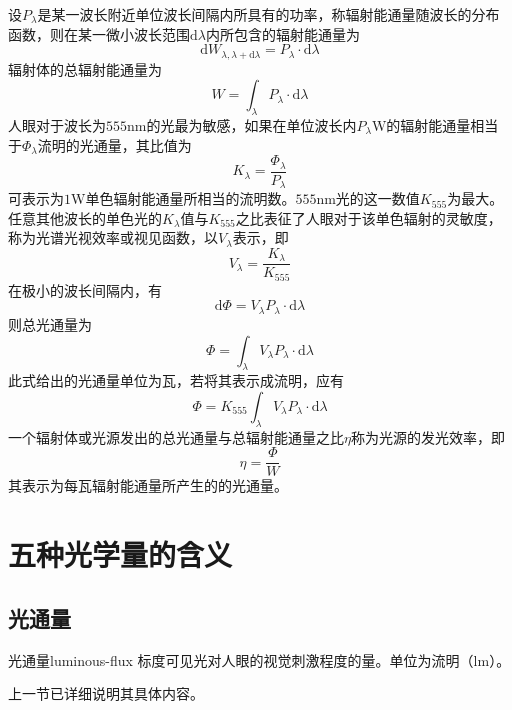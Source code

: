 \documentclass[cn,10pt,chinesefont=founder,math=newtx,cite=super,twoside]{elegantbook}
\begin{document}
设$P_\lambda$是某一波长附近单位波长间隔内所具有的功率，称辐射能通量随波长的分布函数，则在某一微小波长范围$\mathrm{d}\lambda$内所包含的辐射能通量为
\begin{equation}
\mathrm{d}W_{\lambda,\lambda+\mathrm{d}\lambda}=P_{\lambda}\cdot\mathrm{d}\lambda
\end{equation}
辐射体的总辐射能通量为
\begin{equation}
W=\int_{\lambda} P_{\lambda}\cdot\mathrm{d}\lambda
\end{equation}
人眼对于波长为$555$nm的光最为敏感，如果在单位波长内$P_{\lambda}$W的辐射能通量相当于$\varPhi_{\lambda}$流明的光通量，其比值为
\begin{equation}
K_{\lambda}=\frac{\varPhi_{\lambda}}{P_{\lambda}}
\end{equation}
可表示为$1$W单色辐射能通量所相当的流明数。$555$nm光的这一数值$K_{555}$为最大。任意其他波长的单色光的$K_{\lambda}$值与$K_{555}$之比表征了人眼对于该单色辐射的灵敏度，称为光谱光视效率或视见函数，以$V_{\lambda}$表示，即
\begin{equation}
V_{\lambda}=\frac{K_{\lambda}}{K_{555}}
\end{equation}
在极小的波长间隔内，有
\begin{equation}
\mathrm{d}\varPhi=V_{\lambda}P_{\lambda}\cdot\mathrm{d}\lambda
\end{equation}
则总光通量为
\begin{equation}
\varPhi=\int_{\lambda}V_{\lambda}P_{\lambda}\cdot\mathrm{d}\lambda
\end{equation}
此式给出的光通量单位为瓦，若将其表示成流明，应有
\begin{equation}
\varPhi=K_{555}\int_{\lambda}V_{\lambda}P_{\lambda}\cdot\mathrm{d}\lambda
\end{equation}
一个辐射体或光源发出的总光通量与总辐射能通量之比$\eta$称为光源的发光效率，即
\begin{equation}
\eta=\frac{\varPhi}{W}
\end{equation}
其表示为每瓦辐射能通量所产生的的光通量。

\section{五种光学量的含义}

\subsection{光通量}
\begin{definition}{光通量}{luminous-flux}
标度可见光对人眼的视觉刺激程度的量。单位为流明（lm）。
\end{definition}
上一节已详细说明其具体内容。
\end{document}
